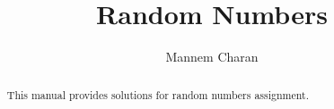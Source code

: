 \documentclass[journal,12pt,twocolumn]{IEEEtran}
\begin{document}
\DeclarePairedDelimiter{\ceil}{\lceil}{\rceil}
\makeatletter
{}
\makeatother
\renewcommand{\thefigure}{\arabic{section}.\arabic{figure}}
\let\StandardTheFigure\thefigure
\let\StandardTheTable\thetable
\let\vec\mathbf
{}
\vspace{3cm}
\title{%
	Random Numbers
}
%
%
%
\author{Mannem Charan}
\maketitle
\tableofcontents
\bigskip


\begin{abstract}
This manual provides solutions for random numbers assignment.
\end{abstract}
\end{document}
